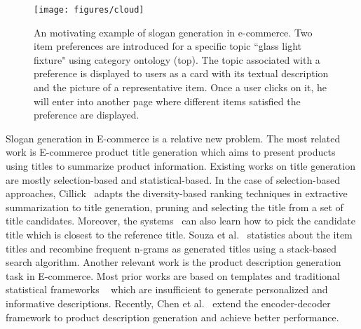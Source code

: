 \begin{figure}[th!]
	\centering
	\texttt{[image: figures/cloud]}
	\caption{An motivating example of slogan generation in e-commerce.
		Two item preferences are introduced for a specific topic ``glass light fixture" using category ontology (top). The topic associated with a preference is displayed to users as a card with its textual description and the picture of a representative item. Once a user clicks on it, he will enter into another page where different items satisfied the preference are displayed. }
	\label{fig:cloud}
\end{figure}


Slogan generation in E-commerce is a relative new problem.
The most related work is E-commerce product title generation
which aims to present products using titles to summarize product information.
Existing works on title generation are mostly 
selection-based and statistical-based.
In the case of selection-based approaches, 
Cillick~\cite{gillick2011elements} adapts the diversity-based ranking techniques in extractive summarization to title generation, pruning and selecting the title from a set of title candidates.
Moreover, the systems~\cite{rosti2007improved,barrault2010many,mathur2017generating,suzuki2011automatic} can also learn how to pick the candidate title which is closest to the reference title.
Souza et al.~\cite{de2018generating} statistics about the item titles and
recombine frequent n-grams as generated titles using a stack-based search algorithm. 
Another relevant work is the product description generation task in E-commerce.
Most prior works are based on templates and traditional statistical frameworks
~\cite{langkilde1998generation,wang2017statistical} which are insufficient to generate personalized and informative descriptions.
Recently, Chen et al.~\cite{ChenLZYZ019} extend the encoder-decoder framework
to product description generation and achieve better performance. 

